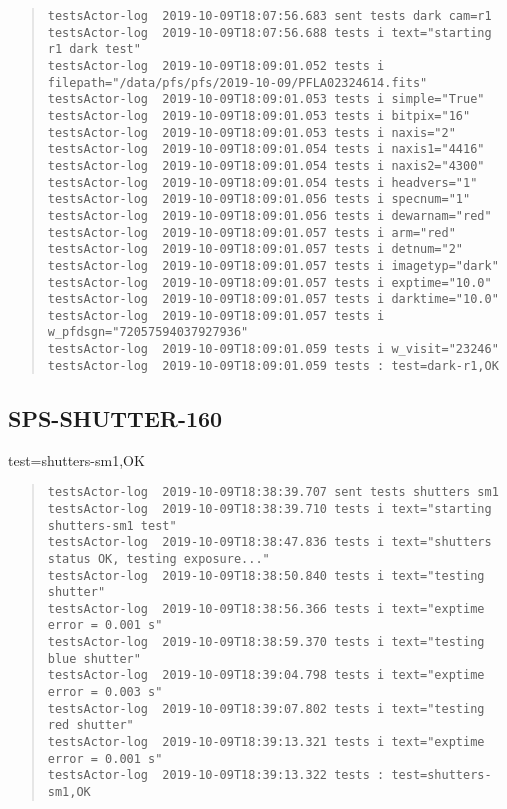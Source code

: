 \begin{quote}
\begin{tiny}
\begin{verbatim}
testsActor-log  2019-10-09T18:07:56.683 sent tests dark cam=r1
testsActor-log  2019-10-09T18:07:56.688 tests i text="starting r1 dark test"
testsActor-log  2019-10-09T18:09:01.052 tests i filepath="/data/pfs/pfs/2019-10-09/PFLA02324614.fits"
testsActor-log  2019-10-09T18:09:01.053 tests i simple="True"
testsActor-log  2019-10-09T18:09:01.053 tests i bitpix="16"
testsActor-log  2019-10-09T18:09:01.053 tests i naxis="2"
testsActor-log  2019-10-09T18:09:01.054 tests i naxis1="4416"
testsActor-log  2019-10-09T18:09:01.054 tests i naxis2="4300"
testsActor-log  2019-10-09T18:09:01.054 tests i headvers="1"
testsActor-log  2019-10-09T18:09:01.056 tests i specnum="1"
testsActor-log  2019-10-09T18:09:01.056 tests i dewarnam="red"
testsActor-log  2019-10-09T18:09:01.057 tests i arm="red"
testsActor-log  2019-10-09T18:09:01.057 tests i detnum="2"
testsActor-log  2019-10-09T18:09:01.057 tests i imagetyp="dark"
testsActor-log  2019-10-09T18:09:01.057 tests i exptime="10.0"
testsActor-log  2019-10-09T18:09:01.057 tests i darktime="10.0"
testsActor-log  2019-10-09T18:09:01.057 tests i w_pfdsgn="72057594037927936"
testsActor-log  2019-10-09T18:09:01.059 tests i w_visit="23246"
testsActor-log  2019-10-09T18:09:01.059 tests : test=dark-r1,OK
\end{verbatim}
\end{tiny}
\end{quote}

\subsection{SPS-SHUTTER-160}
\label{sec:tc-160}

test=shutters-sm1,OK

\begin{quote}
\begin{tiny}
\begin{verbatim}
testsActor-log  2019-10-09T18:38:39.707 sent tests shutters sm1
testsActor-log  2019-10-09T18:38:39.710 tests i text="starting shutters-sm1 test"
testsActor-log  2019-10-09T18:38:47.836 tests i text="shutters status OK, testing exposure..."
testsActor-log  2019-10-09T18:38:50.840 tests i text="testing  shutter"
testsActor-log  2019-10-09T18:38:56.366 tests i text="exptime error = 0.001 s"
testsActor-log  2019-10-09T18:38:59.370 tests i text="testing blue shutter"
testsActor-log  2019-10-09T18:39:04.798 tests i text="exptime error = 0.003 s"
testsActor-log  2019-10-09T18:39:07.802 tests i text="testing red shutter"
testsActor-log  2019-10-09T18:39:13.321 tests i text="exptime error = 0.001 s"
testsActor-log  2019-10-09T18:39:13.322 tests : test=shutters-sm1,OK
\end{verbatim}
\end{tiny}
\end{quote}


